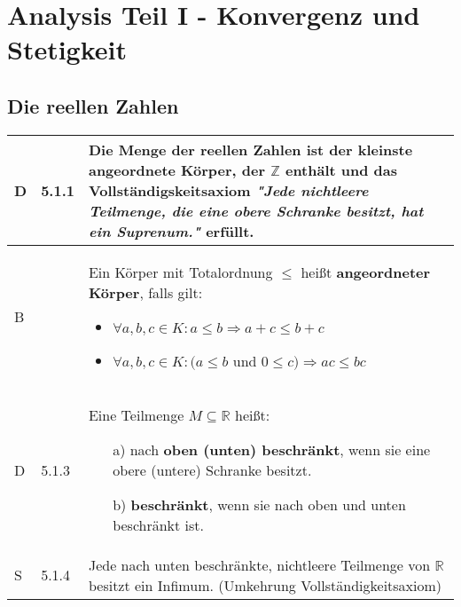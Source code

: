 \section{Analysis Teil I - Konvergenz und Stetigkeit}
\subsection{Die reellen Zahlen}
      
    \begin{longtable}{p{0.75cm} p{1cm} p{16cm}}
        \toprule
        
        D   & 5.1.1 &   Die \textbf{Menge der reellen Zahlen} ist der kleinste angeordnete Körper, 
                        der $\mathbb{Z}$ enthält und das Vollständigskeitsaxiom 
                        \textit{"Jede nichtleere Teilmenge, die eine obere Schranke besitzt, hat ein Suprenum."}
                        erfüllt. \\
        \midrule
        B   &       &   Ein Körper mit Totalordnung $\leq$ heißt \textbf{angeordneter Körper}, falls gilt:
                            \begin{itemize}[topsep=-0.5cm]
                                \item $\forall a,b,c \in K: a \leq b \Rightarrow a + c \leq b + c$
                                \item $\forall a,b,c \in K: (a \leq b$ und $0 \leq c) \Rightarrow ac \leq bc$
                            \end{itemize} \vspace{-0cm} \\
        \midrule
        D   & 5.1.3 &   Eine Teilmenge $M \subseteq \mathbb{R}$ heißt:
                            \begin{itemize}[topsep=-0.5cm]
                                \item[a)] nach \textbf{oben (unten) beschränkt}, wenn sie eine obere (untere) Schranke besitzt.
                                \item[b)] \textbf{beschränkt}, wenn sie nach oben und unten beschränkt ist. 
                            \end{itemize} \vspace{-0cm} \\
        \midrule
        S   & 5.1.4 &   Jede nach unten beschränkte, nichtleere Teilmenge von $\mathbb{R}$ besitzt ein Infimum. \linebreak
                        (Umkehrung Vollständigkeitsaxiom) \\

\end{longtable}
